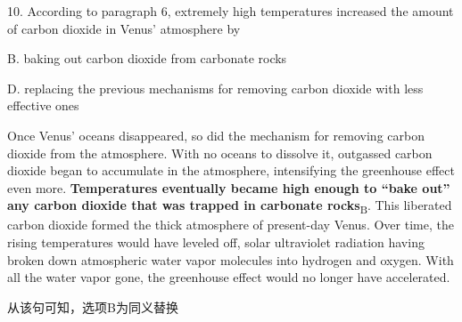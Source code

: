 \begin{blk}
    \begin{qst}
        10. According to paragraph 6, extremely high temperatures increased the amount of carbon dioxide in Venus’ atmosphere by
    \end{qst}

    \begin{chc}
        B. baking out carbon dioxide from carbonate rocks

        D. replacing the previous mechanisms for removing carbon dioxide with less effective ones
    \end{chc}

    \begin{psgq}
        Once Venus’ oceans disappeared, so did the mechanism for removing carbon dioxide from the atmosphere. With no oceans to dissolve it, outgassed carbon dioxide began to accumulate in the atmosphere, intensifying the greenhouse effect even more. \textbf{Temperatures eventually became high enough to “bake out” any carbon dioxide that was trapped in carbonate rocks}\textsubscript{B}. This liberated carbon dioxide formed the thick atmosphere of present-day Venus. Over time, the rising temperatures would have leveled off, solar ultraviolet radiation having broken down atmospheric water vapor molecules into hydrogen and oxygen. With all the water vapor gone, the greenhouse effect would no longer have accelerated.
    \end{psgq}

    \begin{nlz}
        从该句可知，选项B为同义替换
    \end{nlz}
\end{blk}

\newpage